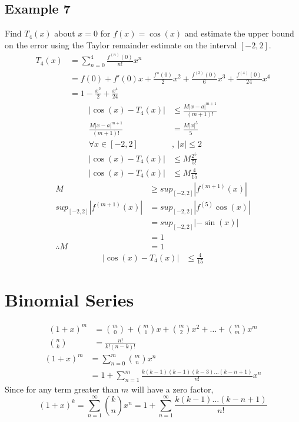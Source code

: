 \documentclass{article}
\theoremstyle{mytheoremstyle}
\theoremstyle{mytheoremstyle}
\theoremstyle{myproblemstyle}
\begin{document}
    \subsection*{Example 7}
    Find $T_4(x)$ about $x=0$ for $f(x)=\cos(x)$ and estimate the upper bound on
    the error using the Taylor remainder estimate on the interval $[-2,2]$.
    \begin{align*}
        T_4(x) &= \sum_{n=0}^{4} \frac{f^{(n)}(0)}{n!} x^n \\
               &= f(0) + f'(0)x + \frac{f''(0)}{2} x^2 + \frac{f^{(3)}(0)}{6} x^3 + \frac{f^{(4)}(0)}{24} x^4 \\
               &= 1 - \frac{x^2}{2} + \frac{x^4}{24}
    \end{align*}
    \begin{align*}
        |\cos(x) - T_4(x)| &\le \frac{M|x-a|^{m+1}}{(m+1)!} \\
        \frac{M|x-a|^{m+1}}{(m+1)!} &= \frac{M|x|^{5}}{5} \\
        \forall x\in[-2,2] &,\ |x| \le 2 \\
        |\cos(x) - T_4(x)| &\le M \frac{2^5}{5!} \\
        |\cos(x) - T_4(x)| &\le M \frac{4}{15}
    \end{align*}
    \begin{align*}
        M &\ge sup_{[-2,2]}|f^{(m+1)}(x)| \\
        sup_{[-2,2]}|f^{(m+1)}(x)|
          &= sup_{[-2,2]}|f^{(5)}\cos(x)| \\
          &= sup_{[-2,2]}|-\sin(x)| \\
          &= 1 \\
        \therefore M &= 1
    \end{align*}
    \begin{align*}
        |\cos(x) - T_4(x)| &\le \frac{4}{15}
    \end{align*}

    \section*{Binomial Series}
    \begin{align*}
        (1+x)^m &=
        \binom{m}{0} +
        \binom{m}{1} x +
        \binom{m}{2} x^2 + \dots +
        \binom{m}{m} x^m \\
        \binom{n}{k} &= \frac{n!}{k!(n-k)!}
    \end{align*}
    \begin{align*}
        (1+x)^m &= \sum_{n=0}^{m} \binom{m}{n} x^n \\
                &= 1 + \sum_{n=1}^{m} \frac{k(k-1)(k-1)(k-3)\dots(k-n+1)}{n!}x^n
    \end{align*}
    Since for any term greater than $m$ will have a zero factor,
    \[
        (1+x)^k = \sum_{n=1}^{\infty} \binom{k}{n} x^n
        = 1+\sum_{n=1}^{\infty} \frac{k(k-1)\dots(k-n+1)}{n!}
    \]
\end{document}
